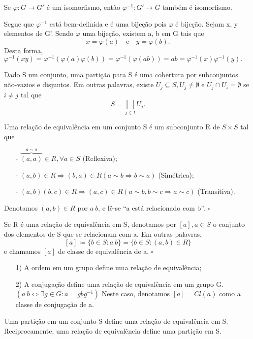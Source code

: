 \documentclass[algebra_notes.tex]{subfiles}
\begin{document}
\begin{lemma*}
	Se $\varphi:G\rightarrow G'$ é um isomorfismo, então $\varphi^{-1}:G'\rightarrow G$ também é isomorfismo.
\end{lemma*}
\begin{proof*}
	Segue que $\varphi^{-1}$ está bem-definida e é uma bijeção pois $\varphi$ é bijeção. Sejam x, y elementos de G'.
	Sendo $\varphi$ uma bijeção, existem a, b em G tais que
	$$
		x = \varphi(a)\quad\text{e}\quad y = \varphi(b).
	$$
	Desta forma, $\varphi^{-1}(xy) = \varphi^{-1}(\varphi(a)\varphi(b)) = \varphi^{-1}(\varphi(ab)) = ab = \varphi^{-1}(x)\varphi^{-1}(y).$ \qedsymbol
\end{proof*}
\begin{def*}
	Dado S um conjunto, uma partição para S é uma cobertura por subconjuntos não-vazios e disjuntos. Em outras palavras,
	existe $U_{j}\subseteq{S}, U_{j}\neq\emptyset$ e $U_{j}\cap U_{i} = \emptyset$ se $i\neq j$ tal que
	$$
		S = \bigsqcup_{j\in I}U_{j}.
	$$
\end{def*}
\begin{def*}
	Uma relação de equivalência em um conjunto S é um subconjunto R de $S\times S$ tal que
	\begin{itemize}
		\item[-]$\overbrace{(a, a)}^{a\sim a}\in R, \forall a\in S$ (Reflexiva);
		\item[-]$(a, b)\in R \Rightarrow (b, a)\in R (a\sim b \Rightarrow b\sim a)$ (Simétrica);
		\item[-]$(a, b)(b, c)\in R \Rightarrow (a, c)\in R (a\sim b, b\sim c \Rightarrow a\sim c)$ (Transitiva).
	\end{itemize}
	Denotamos $(a, b)\in R$ por $a~b$, e lê-se ``a está relacionado com b''. $\square$
\end{def*}
\begin{def*}
	Se R é uma relação de equivalência em S, denotamos por $[a], a\in S$ o conjunto dos elementos de S que se relacionam com a. Em outras palavras,
	$$
		[a]\coloneqq\{b\in S: a~b\} = \{b\in S: (a, b)\in R\}
	$$
	e chamamos $[a]$ de classe de equivalência de a. $\square$
\end{def*}
\begin{example*}
	\begin{itemize}
		\item[1)] A ordem em um grupo define uma relação de equivalência;
		\item[2)] A conjugação define uma relação de equivalência em um grupo G. $(a~b \Longleftrightarrow \exists g\in G: a = gbg^{-1})$
		      Neste caso, denotamos $[a] = Cl(a)$ como a classe de conjugação de a.
	\end{itemize}
\end{example*}
\begin{theorem*}
	Uma partição em um conjunto S define uma relação de equivalência em S. Reciprocamente, uma relação de
	equivalência define uma partição em S.
\end{theorem*}
\end{document}
